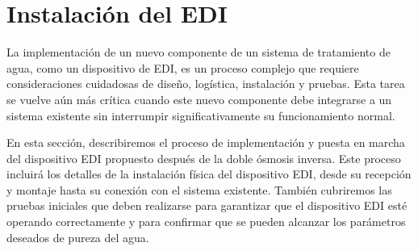 











\section{Instalación del EDI }
\label{sec:implementation_start}

La implementación de un nuevo componente de un sistema de tratamiento de agua,
como un dispositivo de EDI, es un proceso complejo que requiere consideraciones
cuidadosas de diseño, logística, instalación y pruebas. Esta tarea se vuelve
aún más crítica cuando este nuevo componente debe integrarse a un sistema
existente sin interrumpir significativamente su funcionamiento normal.

En esta sección, describiremos el proceso de implementación y puesta en marcha del dispositivo EDI propuesto después de la doble ósmosis inversa. Este proceso incluirá los detalles de la instalación física del dispositivo EDI, desde su recepción y montaje hasta su conexión con el sistema existente. También cubriremos las pruebas iniciales que deben realizarse para garantizar que el dispositivo EDI esté operando correctamente y para confirmar que se pueden alcanzar los parámetros deseados de pureza del agua.

